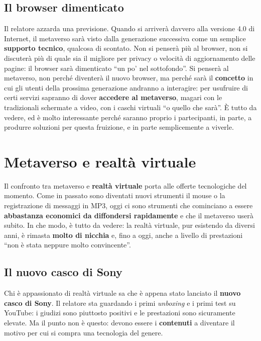 \subsection{Il browser dimenticato}

Il relatore azzarda una previsione. Quando si arriverà davvero alla versione
4.0 di Internet, il metaverso sarà visto dalla generazione successiva come un
semplice \textbf{supporto tecnico}, qualcosa di scontato. Non si penserà più al
browser, non si discuterà più di quale sia il migliore per privacy o velocità di
aggiornamento delle pagine: il browser sarà dimenticato ``un po' nel
sottofondo''. Si penserà al metaverso, non perché diventerà il nuovo browser, ma
perché sarà il \textbf{concetto} in cui gli utenti della prossima generazione
andranno a interagire: per usufruire di certi servizi sapranno di dover
\textbf{accedere al metaverso}, magari con le tradizionali schermate a video, con
i caschi virtuali ``o quello che sarà''. È tutto da vedere, ed è molto
interessante perché saranno proprio i partecipanti, in parte, a produrre
soluzioni per questa fruizione, e in parte semplicemente a viverle.

\section{Metaverso e realtà virtuale}
\label{z8:sec:vr}

Il confronto tra metaverso e \textbf{realtà virtuale} porta alle offerte
tecnologiche del momento. Come in passato sono diventati nuovi strumenti il
mouse o la registrazione di messaggi in MP3, oggi ci sono strumenti che
cominciano a essere \textbf{abbastanza economici da diffondersi rapidamente} e
che il metaverso userà subito. In che modo, è tutto da vedere: la realtà
virtuale, pur esistendo da diversi anni, è rimasta \textbf{molto di nicchia} e,
fino a oggi, anche a livello di prestazioni ``non è stata neppure molto
convincente''.

\subsection{Il nuovo casco di Sony}

Chi è appassionato di realtà virtuale sa che è appena stato lanciato il
\textbf{nuovo casco di Sony}. Il relatore sta guardando i primi
\emph{unboxing} e i primi test su YouTube: i giudizi sono piuttosto positivi e le
prestazioni sono sicuramente elevate. Ma il punto non è questo: devono essere i
\textbf{contenuti} a diventare il motivo per cui si compra una tecnologia del
genere.

